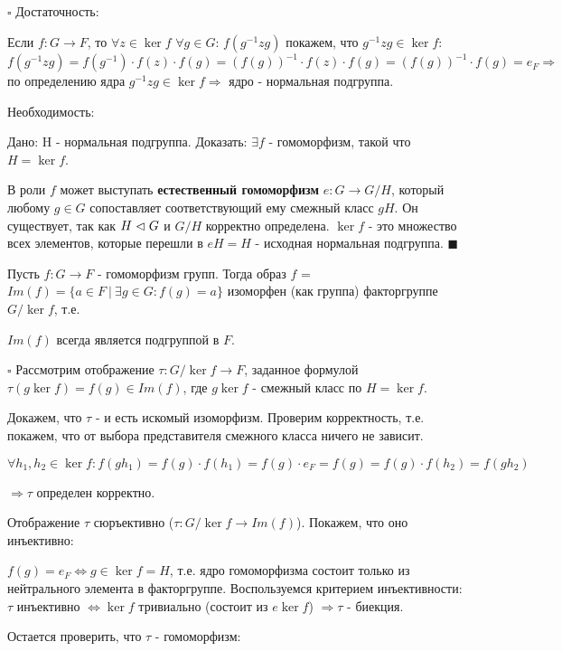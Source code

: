\documentclass[../main.tex]{subfiles}
\begin{document}
\void
$\square$ Достаточность:

Если $f: G\rightarrow F$, то $\forall z\in \ker{f}$ $\forall g\in G$: $f(g^{-1}zg)$ покажем, что 
$g^{-1}zg \in \ker{f}$: $f(g^{-1}zg) = f(g^{-1})\cdot f(z)\cdot f(g) =
(f(g))^{-1}\cdot f(z)\cdot f(g) = (f(g))^{-1}\cdot f(g) = e_F \Rightarrow$ по определению ядра
$g^{-1}zg\in \ker{f} \Rightarrow$ ядро - нормальная подгруппа.

\void
Необходимость:

Дано: H - нормальная подгруппа. Доказать: $\exists f$ - гомоморфизм, такой что $H = \ker{f}$.

В роли $f$ может выступать \textbf{естественный гомоморфизм} $e: G\rightarrow G/H$, который
любому $g\in G$ сопоставляет соответствующий ему смежный класс $gH$. Он существует,
так как $H\vartriangleleft G$ и $G/H$ корректно определена. $\ker{f}$ - это множество всех элементов,
которые перешли в $eH = H$ - исходная нормальная подгруппа. $\blacksquare$

\void
{}

Пусть $f: G\rightarrow F$ - гомоморфизм групп. Тогда образ $f$ = $Im(f) = \{ a\in F\:\vert\: \exists g\in G: f(g) = a\}$
изоморфен (как группа) факторгруппе $G/\ker{f}$, т.е.

\void{} $Im(f)$ всегда является подгруппой в $F$.

\void
$\square$ Рассмотрим отображение $\tau: G/\ker{f}\rightarrow F$, заданное формулой
$\tau(g\ker{f}) = f(g)\in Im(f)$, где $g\ker{f}$ - смежный класс по $H = \ker{f}$.

Докажем, что $\tau$ - и есть искомый изоморфизм. Проверим корректность, т.е. покажем,
что от выбора представителя смежного класса ничего не зависит.

$$\forall h_1,h_2\in \ker{f}: f(gh_1) = f(g)\cdot f(h_1) = f(g)\cdot e_F = f(g) = 
f(g)\cdot f(h_2) = f(gh_2)$$

$\Rightarrow \tau$ определен корректно.

Отображение $\tau$ сюръективно ($\tau: G/\ker{f}\rightarrow Im(f)$). Покажем,
что оно инъективно:

$f(g) = e_F \Longleftrightarrow g\in \ker{f} = H$, т.е. ядро гомоморфизма состоит только из
нейтрального элемента в факторгруппе. Воспользуемся критерием инъективности: $\tau$
инъективно $\Longleftrightarrow \ker{f}$ тривиально (состоит из $e\ker{f}$) $\Longrightarrow \tau$
- биекция.

Остается проверить, что $\tau$ - гомоморфизм:
\end{document}
